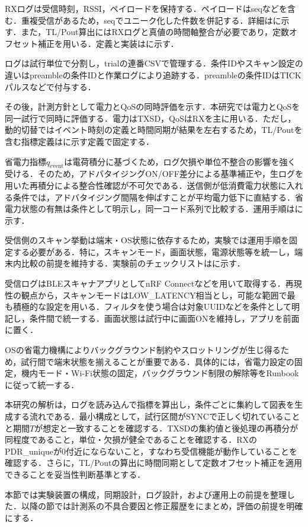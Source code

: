 RXログは受信時刻，RSSI，ペイロードを保持する．ペイロードはseqなどを含む．重複受信があるため，seqでユニーク化した件数を併記する．詳細はに示す．また，TL/Pout算出にはRXログと真値の時間軸整合が必要であり，定数オフセット補正を用いる．定義と実装はに示す．

ログは試行単位で分割し，trialの連番CSVで管理する．条件IDやスキャン設定の違いはpreambleの条件IDと作業ログにより追跡する．preambleの条件IDはTICKパルスなどで付与する．

その後，計測方針として電力とQoSの同時評価を示す．本研究では電力とQoSを同一試行で同時に評価する．電力はTXSD，QoSはRXを主に用いる．ただし，動的切替ではイベント時刻の定義と時間同期が結果を左右するため，TL/Poutを含む指標定義はに示す定義で固定する．

省電力指標$q_{\mathrm{event}}$は電荷積分に基づくため，ログ欠損や単位不整合の影響を強く受ける．そのため，アドバタイジングON/OFF差分による基準補正や，生ログを用いた再積分による整合性確認が不可欠である．送信側が低消費電力状態に入れる条件では，アドバタイジング間隔を伸ばすことが平均電力低下に直結する．省電力状態の有無は条件として明示し，同一コード系列で比較する．運用手順はに示す．

受信側のスキャン挙動は端末・OS状態に依存するため，実験では運用手順を固定する必要がある．特に，スキャンモード，画面状態，電源状態等を統一し，端末内比較の前提を維持する．実験前のチェックリストはに示す．

受信ログはBLEスキャナアプリとしてnRF Connectなどを用いて取得する．再現性の観点から，スキャンモードはLOW\_LATENCY相当とし，可能な範囲で最も積極的な設定を用いる．フィルタを使う場合は対象UUIDなどを条件として明記し，条件間で統一する．画面状態は試行中に画面ONを維持し，アプリを前面に置く．

OSの省電力機構によりバックグラウンド制約やスロットリングが生じ得るため，試行間で端末状態を揃えることが重要である．具体的には，省電力設定の固定，機内モード・Wi-Fi状態の固定，バックグラウンド制限の解除等をRunbookに従って統一する．

本研究の解析は，ログを読み込んで指標を算出し，条件ごとに集約して図表を生成する流れである．最小構成として，試行区間がSYNCで正しく切れていることと期間$T$が想定と一致することを確認する．TXSDの集約値と後処理の再積分が同程度であること，単位・欠損が健全であることを確認する．RXのPDR\_uniqueが0付近にならないこと，すなわち受信機能が動作していることを確認する．さらに，TL/Poutの算出に時間同期として定数オフセット補正を適用できることを妥当性判断基準とする．

本節では実験装置の構成，同期設計，ログ設計，および運用上の前提を整理した．以降の節では計測系の不具合要因と修正履歴をにまとめ，評価の前提を明確にする．











